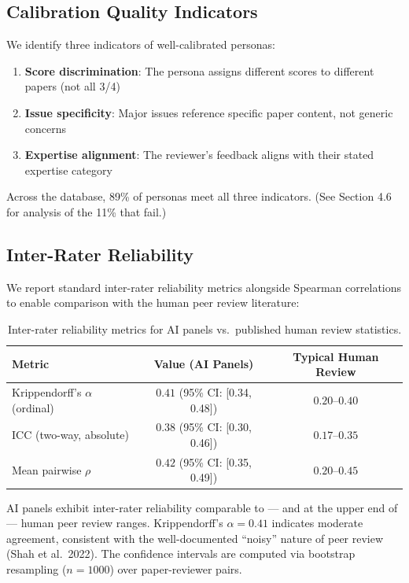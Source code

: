 \subsection{Calibration Quality Indicators}

We identify three indicators of well-calibrated personas:
\begin{enumerate}
    \item \textbf{Score discrimination}: The persona assigns different scores to different papers (not all 3/4)
    \item \textbf{Issue specificity}: Major issues reference specific paper content, not generic concerns
    \item \textbf{Expertise alignment}: The reviewer's feedback aligns with their stated expertise category
\end{enumerate}

Across the database, 89\% of personas meet all three indicators. (See Section 4.6 for analysis of the 11\% that fail.)

\subsection{Inter-Rater Reliability}

We report standard inter-rater reliability metrics alongside Spearman correlations to enable comparison with the human peer review literature:

\begin{table}[h]
\centering
\small
\begin{tabular}{lcc}
\toprule
Metric & Value (AI Panels) & Typical Human Review \\
\midrule
Krippendorff's $\alpha$ (ordinal) & $0.41$ (95\% CI: [0.34, 0.48]) & $0.20$--$0.40$ \\
ICC (two-way, absolute) & $0.38$ (95\% CI: [0.30, 0.46]) & $0.17$--$0.35$ \\
Mean pairwise $\rho$ & $0.42$ (95\% CI: [0.35, 0.49]) & $0.20$--$0.45$ \\
\bottomrule
\end{tabular}
\caption{Inter-rater reliability metrics for AI panels vs.\ published human review statistics.}
\end{table}

\noindent AI panels exhibit inter-rater reliability comparable to --- and at the upper end of --- human peer review ranges. Krippendorff's $\alpha = 0.41$ indicates moderate agreement, consistent with the well-documented ``noisy'' nature of peer review (Shah et al.\ 2022). The confidence intervals are computed via bootstrap resampling ($n = 1000$) over paper-reviewer pairs.

